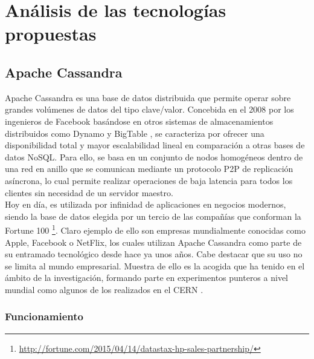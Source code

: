 
\pagestyle{fancy}

\chapter{Análisis de las tecnologías propuestas}
\label{analisis_tecnologias}

\section{Apache Cassandra}

Apache Cassandra es una base de datos distribuida que permite operar sobre grandes volúmenes de datos del tipo clave/valor. Concebida en el 2008 por los ingenieros de Facebook basándose en otros sistemas de almacenamientos distribuidos como Dynamo\cite{decandia2007dynamo} y BigTable \cite{chang2008bigtable}, se caracteriza por ofrecer una  disponibilidad total y mayor escalabilidad lineal en comparación a otras bases de datos NoSQL\cite{nambiartowards}.  Para ello, se basa en un conjunto de nodos homogéneos dentro de una red en anillo que se comunican mediante un protocolo P2P de replicación asíncrona, lo cual permite realizar operaciones de baja latencia para todos los clientes sin necesidad de un servidor maestro.\\

Hoy en día, es utilizada por infinidad de aplicaciones en negocios modernos, siendo la base de datos elegida por un tercio de las compañías que conforman la Fortune 100 \footnote{\url{http://fortune.com/2015/04/14/datastax-hp-sales-partnership/}}. Claro ejemplo de ello son empresas mundialmente conocidas como Apple, Facebook o NetFlix, los cuales utilizan Apache Cassandra como parte de su entramado tecnológico desde hace ya unos años. Cabe destacar que su uso no se limita al mundo empresarial. Muestra de ello es la acogida que ha tenido en el ámbito de la investigación, formando parte en experimentos punteros a nivel mundial como algunos de los realizados en el CERN \cite{sicoe2012persistent}.

\clearpage

\subsection{Funcionamiento}

